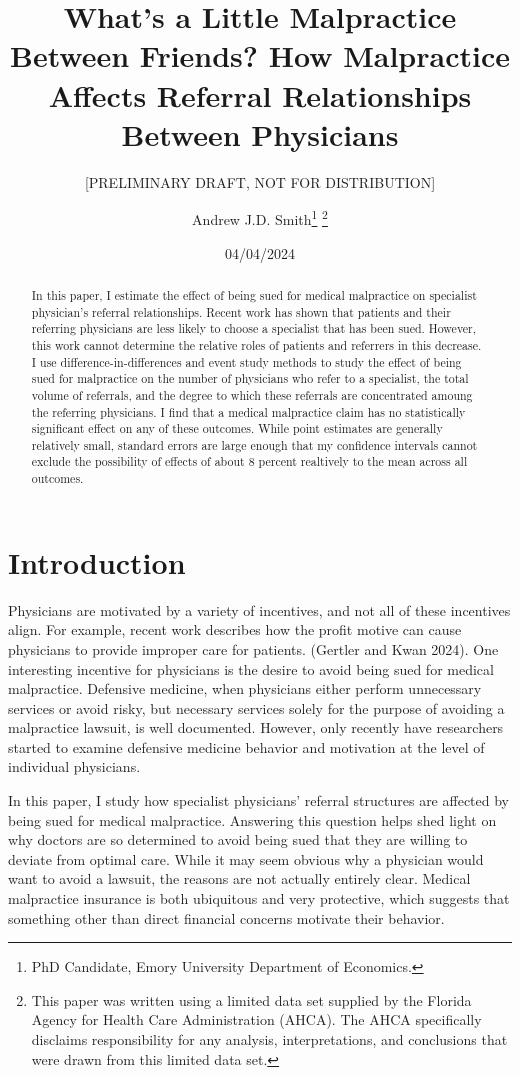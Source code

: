 \documentclass[
  12pt,
]{article}
\title{What's a Little Malpractice Between Friends? How Malpractice Affects Referral Relationships Between Physicians}
\subtitle{{[}PRELIMINARY DRAFT, NOT FOR DISTRIBUTION{]}}
\author{Andrew J.D. Smith\footnote{PhD Candidate, Emory University Department of Economics.} \footnote{This paper was written using a limited data set supplied by the Florida Agency for Health Care Administration (AHCA). The AHCA specifically disclaims responsibility for any analysis, interpretations, and conclusions that were drawn from this limited data set.}}
\date{04/04/2024}
\begin{document}
\maketitle
\begin{abstract}
In this paper, I estimate the effect of being sued for medical malpractice on specialist physician's referral relationships. Recent work has shown that patients and their referring physicians are less likely to choose a specialist that has been sued. However, this work cannot determine the relative roles of patients and referrers in this decrease. I use difference-in-differences and event study methods to study the effect of being sued for malpractice on the number of physicians who refer to a specialist, the total volume of referrals, and the degree to which these referrals are concentrated amoung the referring physicians. I find that a medical malpractice claim has no statistically significant effect on any of these outcomes. While point estimates are generally relatively small, standard errors are large enough that my confidence intervals cannot exclude the possibility of effects of about 8 percent realtively to the mean across all outcomes.
\end{abstract}

\hypertarget{introduction}{%
\section{Introduction}\label{introduction}}

Physicians are motivated by a variety of incentives, and not all of these incentives align. For example, recent work describes how the profit motive can cause physicians to provide improper care for patients. (Gertler and Kwan 2024). One interesting incentive for physicians is the desire to avoid being sued for medical malpractice. Defensive medicine, when physicians either perform unnecessary services or avoid risky, but necessary services solely for the purpose of avoiding a malpractice lawsuit, is well documented. However, only recently have researchers started to examine defensive medicine behavior and motivation at the level of individual physicians.

In this paper, I study how specialist physicians' referral structures are affected by being sued for medical malpractice. Answering this question helps shed light on why doctors are so determined to avoid being sued that they are willing to deviate from optimal care. While it may seem obvious why a physician would want to avoid a lawsuit, the reasons are not actually entirely clear. Medical malpractice insurance is both ubiquitous and very protective, which suggests that something other than direct financial concerns motivate their behavior.
\end{document}
